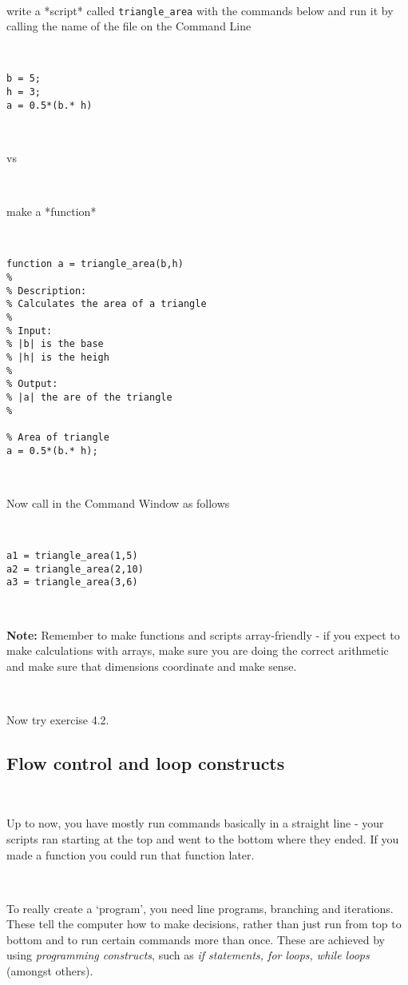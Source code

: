 \documentclass[11pt]{amsart}
\begin{document}
\

write a *script* called \verb+triangle_area+ with the commands below and run it by calling the name of the file on the Command Line

\

\color{blue}
\begin{verbatim}
b = 5;
h = 3;
a = 0.5*(b.* h)
 \end{verbatim}
\color{black}

\

vs 

\

make a *function* 

\

\color{blue}
\begin{verbatim}
function a = triangle_area(b,h)
%
% Description:
% Calculates the area of a triangle
%
% Input:
% |b| is the base
% |h| is the heigh
% 
% Output:
% |a| the are of the triangle
%
 
% Area of triangle
a = 0.5*(b.* h);
 \end{verbatim}
\color{black}

\


Now call in the Command Window as follows

\

\color{blue}
\begin{verbatim}
a1 = triangle_area(1,5)
a2 = triangle_area(2,10)
a3 = triangle_area(3,6)
\end{verbatim}
\color{black}

\

{\bf Note:} Remember to make functions and scripts array-friendly - if you expect to make calculations with arrays, make sure you are doing the correct arithmetic and make sure that dimensions coordinate and make sense.

\

Now try exercise 4.2.

\subsection{Flow control and loop constructs}

\

Up to now, you have mostly run commands basically in a straight line - your scripts ran starting at the top and went to the bottom where they ended. If you made a function you could run that function later.

\

To really create a `program', you need line programs, branching and iterations. These tell the computer how to make decisions, rather than just run from top to bottom and to run certain commands more than once. These are achieved by using {\it programming constructs}, such as {\it if statements, for loops, while loops} (amongst others).
\end{document}
